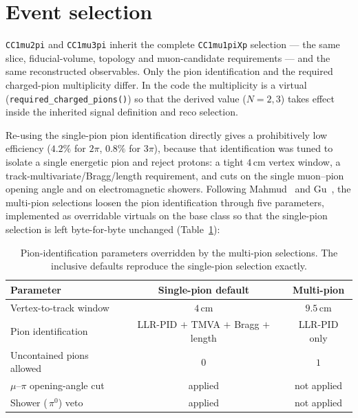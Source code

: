 \documentclass[11pt,a4paper]{article}
\newcommand{\cm}{\,\text{cm}}
\begin{document}
\section{Event selection}
\label{sec:selection}

\texttt{CC1mu2pi} and \texttt{CC1mu3pi} inherit the complete \texttt{CC1mu1piXp}
selection --- the same slice, fiducial-volume, topology and muon-candidate
requirements --- and the same reconstructed observables. Only the pion identification
and the required charged-pion multiplicity differ. In the code the multiplicity is a
virtual (\texttt{required\_charged\_pions()}) so that the derived value ($N=2,3$) takes
effect inside the inherited signal definition and reco selection.

Re-using the single-pion pion identification directly gives a prohibitively low
efficiency ($4.2\%$ for $2\pi$, $0.8\%$ for $3\pi$), because that identification was
tuned to isolate a single energetic pion and reject protons: a tight $4\cm$ vertex
window, a track-multivariate/Bragg/length requirement, and cuts on the single
muon--pion opening angle and on electromagnetic showers. Following
Mahmud~\cite{mahmud} and Gu~\cite{gu}, the multi-pion selections loosen the pion
identification through five parameters, implemented as overridable virtuals on the base
class so that the single-pion selection is left byte-for-byte unchanged
(Table~\ref{tab:mp_params}):

\begin{table}[H]
  \centering
  \caption{Pion-identification parameters overridden by the multi-pion selections.
    The inclusive defaults reproduce the single-pion selection exactly.}
  \label{tab:mp_params}
  \small
  \begin{tabular}{lcc}
    \toprule
    Parameter & Single-pion default & Multi-pion \\
    \midrule
    Vertex-to-track window       & $4\cm$ & $9.5\cm$ \\
    Pion identification          & LLR-PID $+$ TMVA $+$ Bragg $+$ length & LLR-PID only \\
    Uncontained pions allowed    & $0$ & $1$ \\
    $\mu$--$\pi$ opening-angle cut & applied & not applied \\
    Shower (\,$\pi^0$) veto      & applied & not applied \\
    \bottomrule
  \end{tabular}
\end{table}
\end{document}
